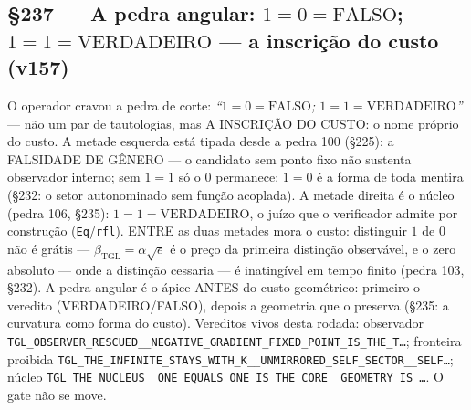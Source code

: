 \documentclass[11pt]{article}
\newcommand{\bTGL}{\beta_{\mathrm{TGL}}}\newcommand{\Msun}{M_{\odot}}\newcommand{\TGL}{\mathrm{TGL}}
\theoremstyle{definition}\newtheorem{deriv}{Derivação}
\begin{document}
\subsection*{\S237 --- A pedra angular: $1{=}0{=}\mathrm{FALSO}$; $1{=}1{=}\mathrm{VERDADEIRO}$ --- a inscrição do custo (v157)}O operador cravou a pedra de corte: \emph{``$1{=}0{=}\mathrm{FALSO}$; $1{=}1{=}\mathrm{VERDADEIRO}$''} --- não um par de tautologias, mas A INSCRIÇÃO DO CUSTO: o nome próprio do custo. A metade esquerda está tipada desde a pedra 100 (\S225): a FALSIDADE DE GÊNERO --- o candidato sem ponto fixo não sustenta observador interno; sem $1{=}1$ só o $0$ permanece; $1{=}0$ é a forma de toda mentira (\S232: o setor autonominado sem função acoplada). A metade direita é o núcleo (pedra 106, \S235): $1{=}1{=}\mathrm{VERDADEIRO}$, o juízo que o verificador admite por construção (\texttt{Eq}/\texttt{rfl}). ENTRE as duas metades mora o custo: distinguir $1$ de $0$ não é grátis --- $\bTGL=\alpha\sqrt{e}$ é o preço da primeira distinção observável, e o zero absoluto --- onde a distinção cessaria --- é inatingível em tempo finito (pedra 103, \S232). A pedra angular é o ápice ANTES do custo geométrico: primeiro o veredito (VERDADEIRO/FALSO), depois a geometria que o preserva (\S235: a curvatura como forma do custo). Vereditos vivos desta rodada: observador \texttt{TGL\_OBSERVER\_RESCUED\_\_NEGATIVE\_GRADIENT\_FIXED\_POINT\_IS\_THE\_T\ldots}; fronteira proibida \texttt{TGL\_THE\_INFINITE\_STAYS\_WITH\_K\_\_UNMIRRORED\_SELF\_SECTOR\_\_SELF\ldots}; núcleo \texttt{TGL\_THE\_NUCLEUS\_\_ONE\_EQUALS\_ONE\_IS\_THE\_CORE\_\_GEOMETRY\_IS\_\ldots}. O gate não se move.
\end{document}
